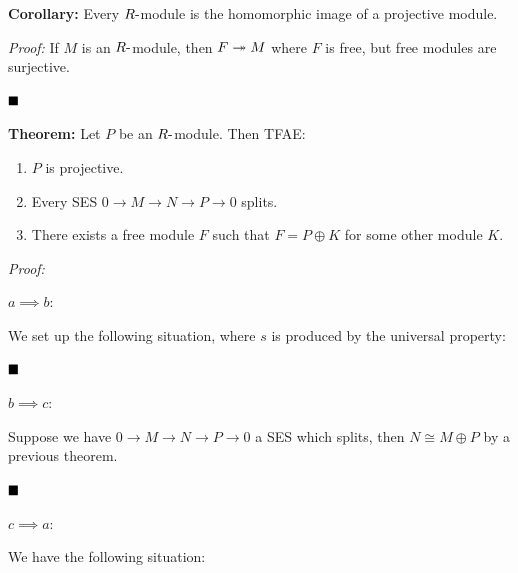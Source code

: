 \textbf{Corollary:} Every \(R{\hbox{-}}\)module is the homomorphic image of a
projective module.

\emph{Proof:} If \(M\) is an \(R{\hbox{-}}\)module, then \(F \twoheadrightarrow M\)
where \(F\) is free, but free modules are surjective.

\(\qed\)

\textbf{Theorem:} Let \(P\) be an \(R{\hbox{-}}\)module. Then TFAE:

\begin{enumerate}
\def\labelenumi{\alph{enumi}.}
\item
  \(P\) is projective.
\item
  Every SES \(0 \to M \to N \to P \to 0\) splits.
\item
  There exists a free module \(F\) such that \(F = P \oplus K\) for some
  other module \(K\).
\end{enumerate}

\emph{Proof:}

\(a \implies b\):

We set up the following situation, where \(s\) is produced by the
universal property:

\begin{center}
\end{center}

\(\qed\)

\(b \implies c\):

Suppose we have \(0 \to M \to N \to P \to 0\) a SES which splits, then
\(N \cong M \oplus P\) by a previous theorem.

\(\qed\)

\(c\implies a\):

We have the following situation:

\begin{center}
\end{center}

